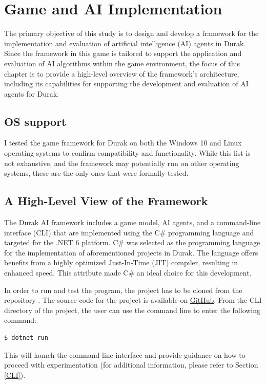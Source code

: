 \chapter{Game and AI Implementation}

The primary objective of this study is to design and develop a framework for the implementation and evaluation of artificial intelligence (AI) agents in Durak. Since the framework in this game is tailored to support the application and evaluation of AI algorithms within the game environment, the focus of this chapter is to provide a high-level overview of the framework's architecture, including its capabilities for supporting the development and evaluation of AI agents for Durak.

\section{OS support}

I tested the game framework for Durak on both the Windows 10 and Linux operating systems to confirm compatibility and functionality. While this list is not exhaustive, and the framework may potentially run on other operating systems, these are the only ones that were formally tested.

\section{A High-Level View of the Framework}

The Durak AI framework includes a game model, AI agents, and a command-line interface (CLI) that are implemented using the C\# programming language and targeted for the .NET 6 platform. C\# was selected as the programming language for the implementation of aforementioned projects in Durak. The language offers benefits from a highly optimized Just-In-Time (JIT) compiler, resulting in enhanced speed. This attribute made C\# an ideal choice for this development.

In order to run and test the program, the project has to be cloned from the repository . The source code for the project is available on \underline{\href{https://github.com/AzamatZarlykov/Durak-AI}{GitHub}}. From the CLI directory of the project, the user can use the command line to enter the following command: 
\begin{lstlisting}
$ dotnet run
\end{lstlisting}
This will launch the command-line interface and provide guidance on how to proceed with experimentation (for additional information, please refer to Section \ref{CLI}).

